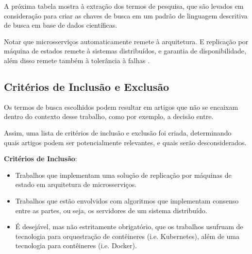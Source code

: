 A próxima tabela mostra à extração dos termos de pesquisa, que são levados em consideração para criar as chaves de busca em um padrão de linguagem descritiva de busca em base de dados científicas.

\begin{table}[!htb]
\caption{Extração dos termos relevantes para construir a busca}
\begin{center}
{
\footnotesize
{}
}
\end{center}
\label{tab:extracao-termos}
\end{table}

Notar que microsserviços automaticamente remete à arquitetura. E replicação por máquina de estados remete à sistemas distribuídos, e garantia de disponibilidade, além disso remete também à tolerância à falhas \cite{schneider1990implementing}.

\subsection{Critérios de Inclusão e Exclusão}

Os termos de busca escolhidos podem resultar em artigos que não se encaixam dentro do contexto desse trabalho, como por exemplo, a decisão entre.

Assim, uma lista de critérios de inclusão e exclusão foi criada, determinando quais artigos podem ser potencialmente relevantes, e quais serão desconsiderados.

\textbf{Critérios de Inclusão}:

\begin{itemize}
\item Trabalhos que implementam uma solução de replicação por máquinas de estado em arquitetura de microsserviços.
\item Trabalhos que estão envolvidos com algoritmos que implementam consenso entre as partes, ou seja, os servidores de um sistema distribuído.
\item É desejável, mas não estritamente obrigatório, que os trabalhos usufruam de tecnologia para orquestração de contêineres (i.e. Kubernetes), além de uma tecnologia para contêineres (i.e. Docker).
\end{itemize}

